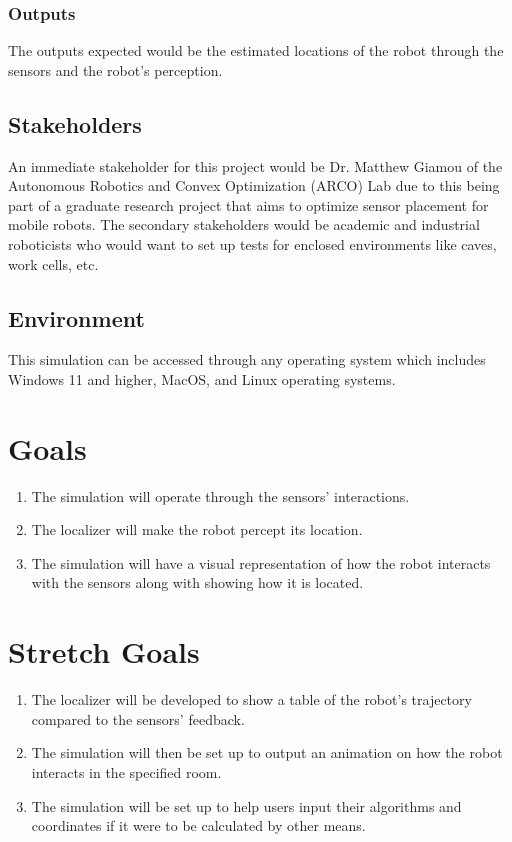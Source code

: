 \documentclass{article}
\begin{document}
\subsubsection{Outputs}
The outputs expected would be the estimated locations of the robot through the sensors and the robot's perception.

\subsection{Stakeholders}
An immediate stakeholder for this project would be Dr. Matthew Giamou of the Autonomous Robotics and Convex Optimization (ARCO) Lab due to this being part of a graduate research project that aims to optimize sensor placement for mobile robots. The secondary stakeholders would be academic and industrial roboticists who would want to set up tests for enclosed environments like caves, work cells, etc.

\subsection{Environment}
This simulation can be accessed through any operating system which includes Windows 11 and higher, MacOS, and Linux operating systems.

\section{Goals}
\begin{enumerate}
    \item The simulation will operate through the sensors' interactions.
    \item The localizer will make the robot percept its location.
    \item The simulation will have a visual representation of how the robot interacts with the sensors along with showing how it is located.
\end{enumerate} 

\section{Stretch Goals}
\begin{enumerate}           
    \item The localizer will be developed to show a table of the robot's trajectory compared to the sensors' feedback.
    \item The simulation will then be set up to output an animation on how the robot interacts in the specified room.
    \item The simulation will be set up to help users input their algorithms and coordinates if it were to be calculated by other means.
\end{enumerate}
\end{document}
